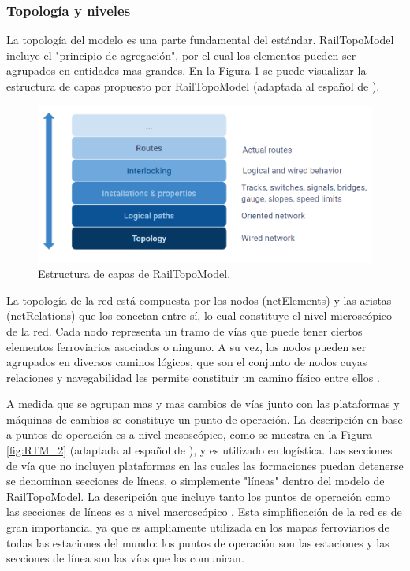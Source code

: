 \subsubsection{Topología y niveles}

    La topología del modelo es una parte fundamental del estándar. RailTopoModel incluye el "principio de agregación", por el cual los elementos pueden ser agrupados en entidades mas grandes. En la Figura \ref{fig:RTM_1} se puede visualizar la estructura de capas propuesto por RailTopoModel (adaptada al español de \cite{Paper_109}).

    \begin{figure}[!h]
        \centering
        \includegraphics[width=1\textwidth]{Figuras/capas}
        \centering\caption{Estructura de capas de RailTopoModel.}
        \label{fig:RTM_1}
    \end{figure}
    
    La topología de la red está compuesta por los nodos (netElements) y las aristas (netRelations) que los conectan entre sí, lo cual constituye el nivel microscópico de la red. Cada nodo representa un tramo de vías que puede tener ciertos elementos ferroviarios asociados o ninguno. A su vez, los nodos pueden ser agrupados en diversos caminos lógicos, que son el conjunto de nodos cuyas relaciones y navegabilidad les permite constituir un camino físico entre ellos \cite{Paper_150}.

    A medida que se agrupan mas y mas cambios de vías junto con las plataformas y máquinas de cambios se constituye un punto de operación. La descripción en base a puntos de operación es a nivel mesoscópico, como se muestra en la Figura \ref{fig:RTM_2} (adaptada al español de \cite{Paper_109}), y es utilizado en logística. Las secciones de vía que no incluyen plataformas en las cuales las formaciones puedan detenerse se denominan secciones de líneas, o simplemente "líneas" dentro del modelo de RailTopoModel. La descripción que incluye tanto los puntos de operación como las secciones de líneas es a nivel macroscópico \cite{Paper_149}. Esta simplificación de la red es de gran importancia, ya que es ampliamente utilizada en los mapas ferroviarios de todas las estaciones del mundo: los puntos de operación son las estaciones y las secciones de línea son las vías que las comunican. 
    
